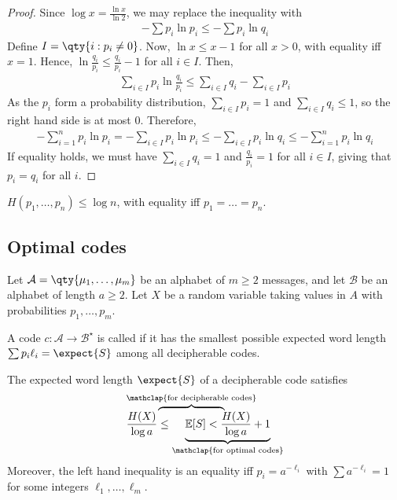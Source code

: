 \begin{proof}
    Since $\log x = \frac{\ln x}{\ln 2}$, we may replace the inequality with
    \begin{align*}
        -\sum p_i \ln p_i \leq -\sum p_i \ln q_i
    \end{align*}
    Define $I = \qty{i : p_i \neq 0}$.
    Now, $\ln x \leq x - 1$ for all $x > 0$, with equality iff $x = 1$.
    Hence, $\ln \frac{q_i}{p_i} \leq \frac{q_i}{p_i} - 1$ for all $i \in I$.
    Then,
    \begin{align*}
        \sum_{i \in I} p_i \ln \frac{q_i}{p_i} \leq \sum_{i \in I} q_i - \sum_{i \in I} p_i
    \end{align*}
    As the $p_i$ form a probability distribution, $\sum_{i \in I} p_i = 1$ and $\sum_{i \in I} q_i \leq 1$, so the right hand side is at most 0.
    Therefore,
    \begin{align*}
        -\sum_{i=1}^n p_i \ln p_i = -\sum_{i \in I} p_i \ln p_i \leq -\sum_{i \in I} p_i \ln q_i \leq -\sum_{i=1}^n p_i \ln q_i
    \end{align*}
    If equality holds, we must have $\sum_{i \in I} q_i = 1$ and $\frac{q_i}{p_i} = 1$ for all $i \in I$, giving that $p_i = q_i$ for all $i$.
\end{proof}

\begin{corollary}
    $H(p_1, \dots, p_n) \leq \log n$, with equality iff $p_1 = \dots = p_n$.
\end{corollary}

\subsection{Optimal codes}
Let $\mathcal A = \qty{\mu_1, \dots, \mu_m}$ be an alphabet of $m \geq 2$ messages, and let $\mathcal B$ be an alphabet of length $a \geq 2$.
Let $X$ be a random variable taking values in $A$ with probabilities $p_1, \dots, p_m$.

\begin{definition}
    A code $c \colon \mathcal A \to \mathcal B^\star$ is called  if it has the smallest possible expected word length $\sum p_i \ell_i = \expect{S}$ among all decipherable codes.
\end{definition}

\begin{theorem}
    The expected word length $\expect{S}$ of a decipherable code satisfies
    \begin{align*}
        \rlap{\(\overbrace{\phantom{\frac{H(X)}{\log a} \leq \mathbb E[S]}}^{\mathclap{\text{for decipherable codes}}}\)} \frac{H(X)}{\log a} \leq \underbrace{\mathbb E[S] < \frac{H(X)}{\log a} + 1}_{\mathclap{\text{for optimal codes}}}
    \end{align*}
    Moreover, the left hand inequality is an equality iff $p_i = a^{-\ell_i}$ with $\sum a^{-\ell_i} = 1$ for some integers $\ell_1, \dots, \ell_m$.
\end{theorem}

